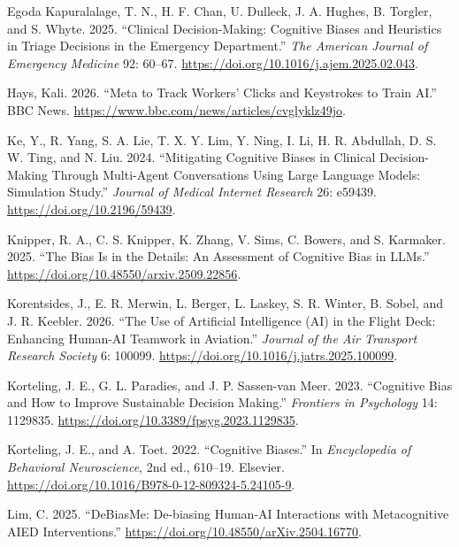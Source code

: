 \documentclass[
  manuscript,
  anonymous,
  review]{acmart}
\newlength{\cslhangindent}
\newenvironment{CSLReferences}[2] %
 {\begin{list}{}{%
  \setlength{\itemindent}{0pt}
  \setlength{\leftmargin}{0pt}
  \setlength{\parsep}{0pt}
  \ifodd #1
   \setlength{\leftmargin}{\cslhangindent}
   \setlength{\itemindent}{-1\cslhangindent}
  \fi
  \setlength{\itemsep}{#2\baselineskip}}}
 {\end{list}}
\begin{document}
\begin{CSLReferences}{1}{0}
Egoda Kapuralalage, T. N., H. F. Chan, U. Dulleck, J. A. Hughes, B.
Torgler, and S. Whyte. 2025. {``Clinical Decision-Making: {Cognitive}
Biases and Heuristics in Triage Decisions in the Emergency
Department.''} \emph{The American Journal of Emergency Medicine} 92:
60--67. \url{https://doi.org/10.1016/j.ajem.2025.02.043}.

Hays, Kali. 2026. {``Meta to Track Workers' Clicks and Keystrokes to
Train AI.''} BBC News.
\url{https://www.bbc.com/news/articles/cvglyklz49jo}.

Ke, Y., R. Yang, S. A. Lie, T. X. Y. Lim, Y. Ning, I. Li, H. R.
Abdullah, D. S. W. Ting, and N. Liu. 2024. {``Mitigating Cognitive
Biases in Clinical Decision-Making Through Multi-Agent Conversations
Using Large Language Models: {Simulation} Study.''} \emph{Journal of
Medical Internet Research} 26: e59439.
\url{https://doi.org/10.2196/59439}.

Knipper, R. A., C. S. Knipper, K. Zhang, V. Sims, C. Bowers, and S.
Karmaker. 2025. {``The Bias Is in the Details: {An} Assessment of
Cognitive Bias in {LLMs}.''}
\url{https://doi.org/10.48550/arxiv.2509.22856}.

Korentsides, J., E. R. Merwin, L. Berger, L. Laskey, S. R. Winter, B.
Sobel, and J. R. Keebler. 2026. {``The Use of Artificial Intelligence
({AI}) in the Flight Deck: {Enhancing} Human-{AI} Teamwork in
Aviation.''} \emph{Journal of the Air Transport Research Society} 6:
100099. \url{https://doi.org/10.1016/j.jatrs.2025.100099}.

Korteling, J. E., G. L. Paradies, and J. P. Sassen-van Meer. 2023.
{``Cognitive Bias and How to Improve Sustainable Decision Making.''}
\emph{Frontiers in Psychology} 14: 1129835.
\url{https://doi.org/10.3389/fpsyg.2023.1129835}.

Korteling, J. E., and A. Toet. 2022. {``Cognitive Biases.''} In
\emph{Encyclopedia of Behavioral Neuroscience}, 2nd ed., 610--19.
Elsevier. \url{https://doi.org/10.1016/B978-0-12-809324-5.24105-9}.

Lim, C. 2025. {``{DeBiasMe}: {De-biasing} Human-{AI} Interactions with
Metacognitive {AIED} Interventions.''}
\url{https://doi.org/10.48550/arXiv.2504.16770}.


\end{CSLReferences}
\end{document}
